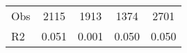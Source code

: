 \begin{tabular}{l*{4}{c}}
\hline                                                                                                                                                                                                                                            
 Obs                   &               2115               &       1913                       &       1374                &              2701                                               \\ 
 R2                    &                      0.051              &              0.001                      &              0.050               &                     0.050                                              \\ 
\hline \end{tabular}                                                                                                                                                                                                              